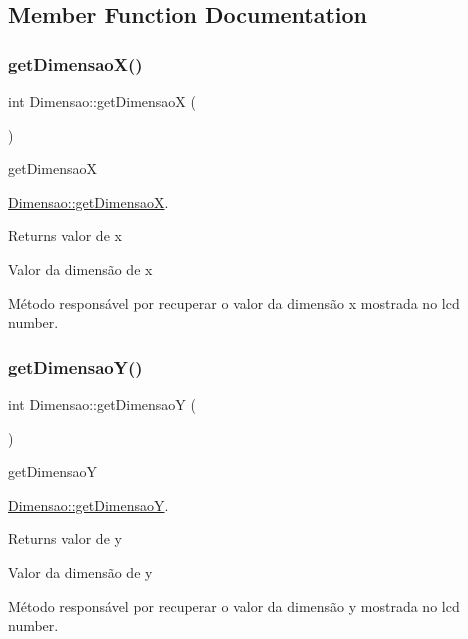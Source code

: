 \subsection{Member Function Documentation}
\mbox{\label{classDimensao_a212470bd9d76fd1fb31ba816109045d2}} 
\subsubsection{\texorpdfstring{getDimensaoX()}{getDimensaoX()}}
{\footnotesize\ttfamily int Dimensao\+::get\+DimensaoX (\begin{DoxyParamCaption}{ }\end{DoxyParamCaption})}



get\+DimensaoX 

\mbox{\hyperlink{classDimensao_a212470bd9d76fd1fb31ba816109045d2}{Dimensao\+::get\+DimensaoX}}.

\begin{DoxyReturn}{Returns}
valor de x

Valor da dimensão de x
\end{DoxyReturn}
Método responsável por recuperar o valor da dimensão x mostrada no lcd number. \mbox{\label{classDimensao_a5141fbeb3e622165a1b0a521c5974082}} 
\subsubsection{\texorpdfstring{getDimensaoY()}{getDimensaoY()}}
{\footnotesize\ttfamily int Dimensao\+::get\+DimensaoY (\begin{DoxyParamCaption}{ }\end{DoxyParamCaption})}



get\+DimensaoY 

\mbox{\hyperlink{classDimensao_a5141fbeb3e622165a1b0a521c5974082}{Dimensao\+::get\+DimensaoY}}.

\begin{DoxyReturn}{Returns}
valor de y

Valor da dimensão de y
\end{DoxyReturn}
Método responsável por recuperar o valor da dimensão y mostrada no lcd number. \mbox{\label{classDimensao_a6a548c7d1634f8b593241c68c74b83c7}} 
